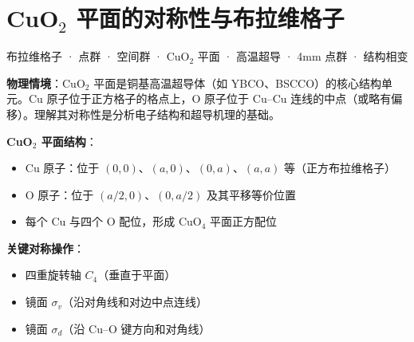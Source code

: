 
\section{CuO$_2$ 平面的对称性与布拉维格子}
\label{sec:cuo2-symmetry}

\begin{tipbox}[关键词标签]
布拉维格子 · 点群 · 空间群 · CuO$_2$ 平面 · 高温超导 · 4mm 点群 · 结构相变
\end{tipbox}

\begin{modelbox}
\textbf{物理情境}：CuO$_2$ 平面是铜基高温超导体（如 YBCO、BSCCO）的核心结构单元。Cu 原子位于正方格子的格点上，O 原子位于 Cu--Cu 连线的中点（或略有偏移）。理解其对称性是分析电子结构和超导机理的基础。

\textbf{CuO$_2$ 平面结构}：
\begin{itemize}[nosep]
    \item Cu 原子：位于 $(0,0)$、$(a,0)$、$(0,a)$、$(a,a)$ 等（正方布拉维格子）
    \item O 原子：位于 $(a/2,0)$、$(0,a/2)$ 及其平移等价位置
    \item 每个 Cu 与四个 O 配位，形成 CuO$_4$ 平面正方配位
\end{itemize}

\textbf{关键对称操作}：
\begin{itemize}[nosep]
    \item 四重旋转轴 $C_4$（垂直于平面）
    \item 镜面 $\sigma_v$（沿对角线和对边中点连线）
    \item 镜面 $\sigma_d$（沿 Cu--O 键方向和对角线）
\end{itemize}
\end{modelbox}

